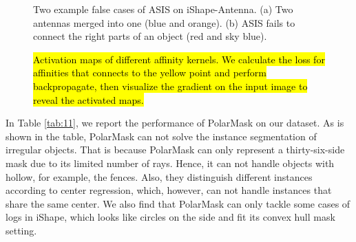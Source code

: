 \begin{figure}
\centering
    {\begin{minipage}[t]{0.45\linewidth}
    \caption{Two example false cases of ASIS on iShape-Antenna. (a) Two antennas merged into one (blue and orange). (b) ASIS fails to connect the right parts of an object (red and sky blue).}
    \label{fig:badcase}
    \end{minipage}}
    \hspace{5mm}
    {\begin{minipage}[t]{0.45\linewidth}
    \caption{\hl{Activation maps of different affinity kernels. We calculate the loss for affinities that connects to the yellow point and perform backpropagate, then visualize the gradient on the input image to reveal the activated maps.}}
    \label{fig:loss_vis}
    \end{minipage}}

\end{figure}

In Table \ref{tab:11}, we report the performance of PolarMask \cite{xie2020polarmask} on our dataset. As is shown in the table, PolarMask can not solve the instance segmentation of irregular objects. That is because PolarMask can only represent a thirty-six-side mask due to its limited number of rays. Hence, it can not handle objects with hollow, for example, the fences. Also, they distinguish different instances according to center regression, which, however, can not handle instances that share the same center. We also find that PolarMask can only tackle some cases of logs in iShape, which looks like circles on the side and fit its convex hull mask setting.  

